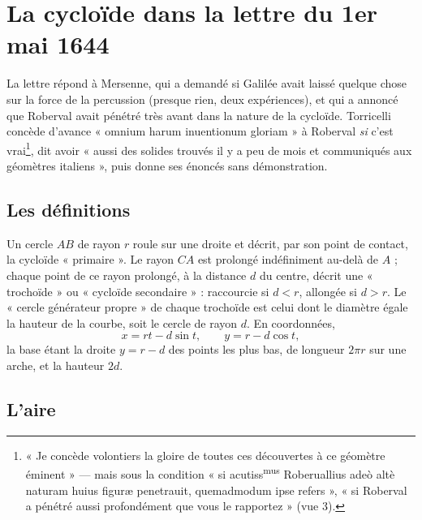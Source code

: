 \documentclass[11pt,a4paper]{article}
\begin{document}
\section*{La cycloïde dans la lettre du 1er mai 1644}

La lettre répond à Mersenne, qui a demandé si Galilée avait laissé quelque chose
sur la force de la percussion (presque rien, deux expériences), et qui a annoncé
que Roberval avait pénétré très avant dans la nature de la cycloïde. Torricelli
concède d'avance « omnium harum inuentionum gloriam » à Roberval \emph{si} c'est
vrai\footnote{« Je concède volontiers la gloire de toutes ces découvertes à ce
géomètre éminent » — mais sous la condition « si acutiss\textsuperscript{mus}
Roberuallius adeò altè naturam huius figuræ penetrauit, quemadmodum ipse refers »,
« si Roberval a pénétré aussi profondément que vous le rapportez » (vue 3).},
dit avoir « aussi des solides trouvés il y a peu de mois et communiqués aux
géomètres italiens », puis donne ses énoncés sans démonstration.

\subsection*{Les définitions}

Un cercle $AB$ de rayon $r$ roule sur une droite et décrit, par son point de
contact, la cycloïde « primaire ». Le rayon $CA$ est prolongé indéfiniment au-delà
de $A$ ; chaque point de ce rayon prolongé, à la distance $d$ du centre, décrit
une « trochoïde » ou « cycloïde secondaire » : raccourcie si $d<r$, allongée si
$d>r$. Le « cercle générateur propre » de chaque trochoïde est celui dont le
diamètre égale la hauteur de la courbe, soit le cercle de rayon $d$. En
coordonnées,
\[
x = rt - d\sin t,\qquad y = r - d\cos t ,
\]
la base étant la droite $y = r-d$ des points les plus bas, de longueur $2\pi r$
sur une arche, et la hauteur $2d$.

\subsection*{L'aire}
\end{document}
